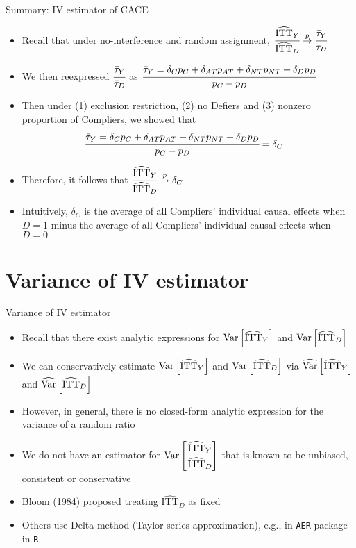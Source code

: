 \documentclass[table, xcolor={dvipsnames}, 9pt]{beamer}
\theoremstyle{newstyle}
\DeclareMathOperator{\Var}{\rm{Var}}
\begin{document}
\begin{frame}{Summary: IV estimator of CACE}
\begin{itemize}
\item Recall that under no-interference and random assignment, $\cfrac{\widehat{\text{ITT}}_Y}{\widehat{\text{ITT}}_D} \overset{p}{\to} \cfrac{\bar{\tau}_Y}{\bar{\tau}_D}$
\item \pause We then reexpressed $\cfrac{\bar{\tau}_Y}{\bar{\tau}_D}$ as $\cfrac{\bar{\tau}_Y = \delta_C p_C + \delta_{AT} p_{AT} + \delta_{NT} p_{NT} + \delta_D p_D}{p_C - p_D}$
\item \pause Then under (1) exclusion restriction, (2) no Defiers and (3) nonzero proportion of Compliers, we showed that 
\begin{align*}
\cfrac{\bar{\tau}_Y = \delta_C p_C + \delta_{AT} p_{AT} + \delta_{NT} p_{NT} + \delta_D p_D}{p_C - p_D} & = \delta_C
\end{align*}
\item \pause Therefore, it follows that $\cfrac{\widehat{\text{ITT}}_Y}{\widehat{\text{ITT}}_D} \overset{p}{\to} \delta_C$
\item \pause Intuitively, $\delta_C$ is the average of all Compliers' individual causal effects when $D = 1$ minus the average of all Compliers' individual causal effects when $D = 0$
\end{itemize}
\end{frame}
\section{Variance of IV estimator}
\begin{frame}{Variance of IV estimator}
\begin{itemize}
\item Recall that there exist analytic expressions for $\Var\left[\widehat{\text{ITT}}_Y\right]$ and $\Var\left[\widehat{\text{ITT}}_D\right]$
\item \pause We can conservatively estimate $\Var\left[\widehat{\text{ITT}}_Y\right]$ and $\Var\left[\widehat{\text{ITT}}_D\right]$ via $\widehat{\Var}\left[\widehat{\text{ITT}}_Y\right]$ and $\widehat{\Var}\left[\widehat{\text{ITT}}_D\right]$
\item \pause However, in general, there is no closed-form analytic expression for the variance of a random ratio
\item \pause We do not have an estimator for $\Var\left[\cfrac{\widehat{\text{ITT}}_Y}{\widehat{\text{ITT}}_D}\right]$ that is known to be unbiased, consistent or conservative
\item \pause Bloom (1984) proposed treating $\widehat{\text{ITT}}_D$ as fixed
\item \pause Others use Delta method (Taylor series approximation), e.g., in \texttt{AER} package in \texttt{R}
\end{itemize}	
\end{frame}
\end{document}

